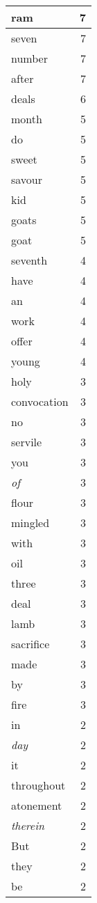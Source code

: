 \begin{center}
\begin{longtable}{l|r}
ram & 7\\ \hline 
seven & 7\\ \hline 
number & 7\\ \hline 
after & 7\\ \hline 
deals & 6\\ \hline 
month & 5\\ \hline 
do & 5\\ \hline 
sweet & 5\\ \hline 
savour & 5\\ \hline 
kid & 5\\ \hline 
goats & 5\\ \hline 
goat & 5\\ \hline 
seventh & 4\\ \hline 
have & 4\\ \hline 
an & 4\\ \hline 
work & 4\\ \hline 
offer & 4\\ \hline 
young & 4\\ \hline 
holy & 3\\ \hline 
convocation & 3\\ \hline 
no & 3\\ \hline 
servile & 3\\ \hline 
you & 3\\ \hline 
\emph{of} & 3\\ \hline 
flour & 3\\ \hline 
mingled & 3\\ \hline 
with & 3\\ \hline 
oil & 3\\ \hline 
three & 3\\ \hline 
deal & 3\\ \hline 
lamb & 3\\ \hline 
sacrifice & 3\\ \hline 
made & 3\\ \hline 
by & 3\\ \hline 
fire & 3\\ \hline 
in & 2\\ \hline 
\emph{day} & 2\\ \hline 
it & 2\\ \hline 
throughout & 2\\ \hline 
atonement & 2\\ \hline 
\emph{therein} & 2\\ \hline 
But & 2\\ \hline 
they & 2\\ \hline 
be & 2\\ \hline 

\end{longtable}
\end{center}
